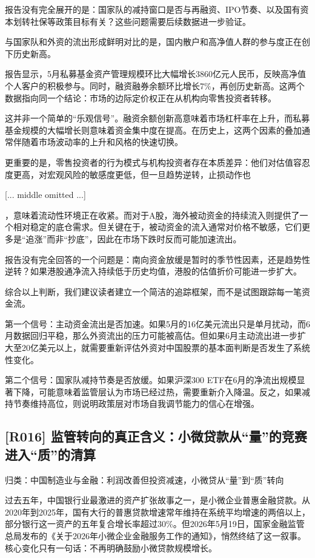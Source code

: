 \documentclass[11pt]{ctexart}
\begin{document}
报告没有完全展开的是：国家队的减持窗口是否与再融资、IPO节奏、以及国有资本划转社保等政策目标有关？这些问题需要后续数据进一步验证。

与国家队和外资的流出形成鲜明对比的是，国内散户和高净值人群的参与度正在创下历史新高。

报告显示，5月私募基金资产管理规模环比大幅增长3860亿元人民币，反映高净值个人客户的积极参与。同时，融资融券余额环比增长7\%，再创历史新高。这两个数据指向同一个结论：市场的边际定价权正在从机构向零售投资者转移。

这并非一个简单的“乐观信号”。融资余额创新高意味着市场杠杆率在上升，而私募基金规模的大幅增长则意味着资金集中度在提高。在历史上，这两个因素的叠加通常伴随着市场波动率的上升和风格的快速切换。

更重要的是，零售投资者的行为模式与机构投资者存在本质差异：他们对估值容忍度更高，对宏观风险的敏感度更低，但一旦趋势逆转，止损动作也

[... middle omitted ...]

，意味着流动性环境正在收紧。而对于A股，海外被动资金的持续流入则提供了一个相对稳定的底仓需求。但关键在于，被动资金的流入通常对价格不敏感，它们更多是“追涨”而非“抄底”，因此在市场下跌时反而可能加速流出。

报告没有完全回答的一个问题是：南向资金放缓是暂时的季节性因素，还是趋势性逆转？如果港股通净流入持续低于历史均值，港股的估值折价可能进一步扩大。

综合以上判断，我们建议读者建立一个简洁的追踪框架，而不是试图跟踪每一笔资金流。

第一个信号：主动资金流出是否加速。如果5月的16亿美元流出只是单月扰动，而6月数据回归平稳，那么外资流出的压力可能被高估。但如果6月主动流出进一步扩大至20亿美元以上，就需要重新评估外资对中国股票的基本面判断是否发生了系统性变化。

第二个信号：国家队减持节奏是否放缓。如果沪深300 ETF在6月的净流出规模显著下降，可能意味着监管层认为市场已经过热，需要重新介入降温。反之，如果减持节奏维持高位，则说明政策层对市场自我调节能力的信心在增强。

\subsection{[R016] 监管转向的真正含义：小微贷款从“量”的竞赛进入“质”的清算}
{\small\color{refgray}归类：中国制造业与金融：利润改善但投资减速，小微贷从“量”到“质”转向}

过去五年，中国银行业最激进的资产扩张故事之一，是小微企业普惠金融贷款。从2020年到2025年，国有大行的普惠贷款增速常年维持在系统平均增速的两倍以上，部分银行这一资产的五年复合增长率超过30\%。但2026年5月19日，国家金融监管总局发布的《关于2026年小微企业金融服务工作的通知》，悄然终结了这一叙事。核心变化只有一句话：不再明确鼓励小微贷款规模增长。
\end{document}

